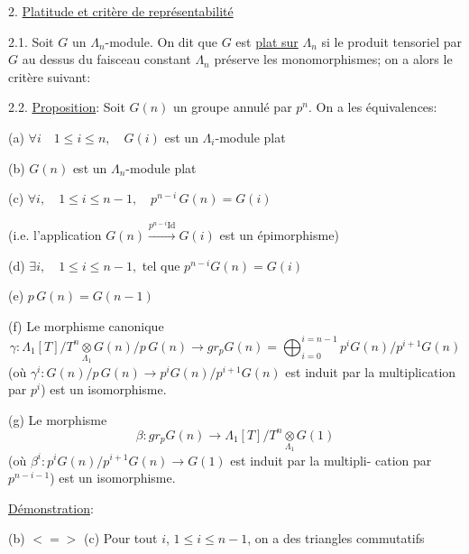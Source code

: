 
2. \uline{Platitude et critère de représentabilité}

2.1. Soit $G$ un $\Lambda_n$-module. On dit que $G$ est \uline{plat sur} $\Lambda_n$ si
le produit tensoriel par $G$ au dessus du faisceau constant $\Lambda_n$ préserve
les monomorphismes; on a alors le critère suivant:

2.2. \uline{Proposition}: Soit $G(n)$ un groupe annulé par $p^n$. On a les
équivalences:

(a) $\forall i \quad 1 \leq i \leq n, \quad G(i)$ est un $\Lambda_i$-module plat

(b) $G(n)$ est un $\Lambda_n$-module plat

(c) $\forall i, \quad 1 \leq i \leq n-1, \quad p^{n-i}\, G(n) = G(i)$

(i.e. l'application $G(n) \xrightarrow{p^{n-i}\mathrm{Id}} G(i)$ est un épimorphisme)

(d) $\exists i, \quad 1 \leq i \leq n-1,$ tel que $p^{n-i}G(n) = G(i)$

(e) $p\, G(n) = G(n-1)$

(f) Le morphisme canonique
\[ \gamma\colon \Lambda_1[T]/T^n \underset{\Lambda_1}{\otimes} G(n)/p\, G(n) \to gr_p G(n) = \bigoplus_{i=0}^{i=n-1} p^i G(n)/p^{i+1}G(n) \]
(où $\gamma^i\colon G(n)/p\, G(n) \to p^i G(n)/p^{i+1}G(n)$ est induit par la
multiplication par $p^i$) est un isomorphisme.

(g) Le morphisme
\[ \beta\colon gr_p G(n) \to \Lambda_1[T]/T^n \underset{\Lambda_1}{\otimes} G(1) \]
(où $\beta^i\colon p^i G(n)/p^{i+1}G(n) \to G(1)$ est induit par la multipli-%
cation par $p^{n-i-1}$) est un isomorphisme.

\uline{Démonstration}:

(b) $<=>$ (c) Pour tout $i$, $1 \leq i \leq n-1$, on a des triangles commutatifs

